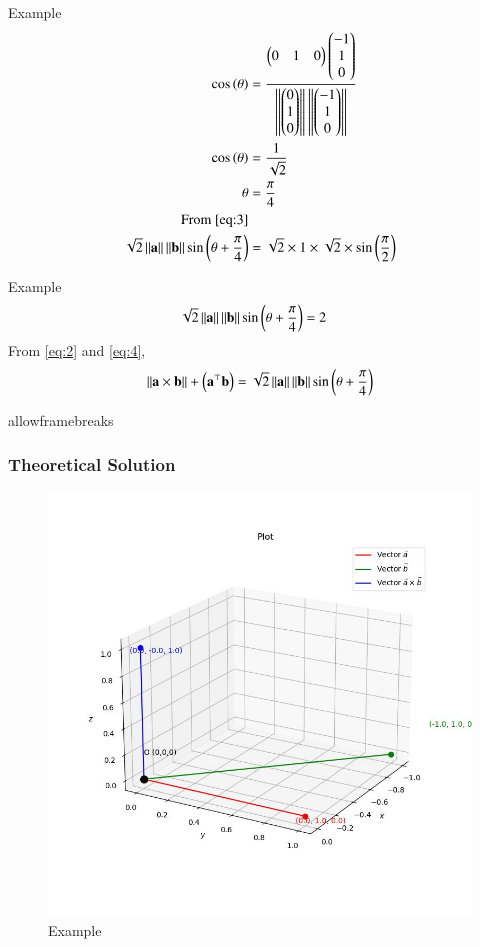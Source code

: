 \documentclass{beamer}
\begin{document}
\begin{frame}{Example}
\begin{align}
    \cos\left(\theta\right) &= \frac{\begin{pmatrix}0 & 1 &  0\end{pmatrix} \begin{pmatrix}-1 \\ 1 \\ 0\end{pmatrix}}{\left\lVert\begin{pmatrix}0 \\ 1 \\  0\end{pmatrix}\right\rVert\left\lVert\begin{pmatrix}-1 \\ 1 \\ 0\end{pmatrix}\right\rVert} \\
    \cos\left(\theta\right) &= \frac{1}{\sqrt{2}} \\
    \theta &= \frac{\pi}{4} \label{eq:3} \\
    \text{From \eqref{eq:3}} \\
    \sqrt{2} \left\lVert\mathbf{a}\right\rVert \left\lVert\mathbf{b}\right\rVert \sin\left(\theta + \frac{\pi}{4}\right) &= \sqrt{2} \times 1 \times \sqrt{2} \times \sin\left(\frac{\pi}{2}\right)
\end{align}
\end{frame}

\begin{frame}{Example}
\begin{align}
    \sqrt{2} \left\lVert\mathbf{a}\right\rVert \left\lVert\mathbf{b}\right\rVert \sin\left(\theta + \frac{\pi}{4}\right) &= 2 \label{eq:4}
\end{align}
From \eqref{eq:2} and \eqref{eq:4},
\begin{align*}
\left\lVert\mathbf{a} \times \mathbf{b}\right\rVert + \left(\mathbf{a}^\top\mathbf{b}\right) = \sqrt{2} \left\lVert\mathbf{a}\right\rVert \left\lVert\mathbf{b}\right\rVert \sin\left(\theta + \frac{\pi}{4}\right)
\end{align*}
\end{frame}

\begin{frame}{allowframebreaks}
\frametitle{Theoretical Solution}
\begin{figure}
    \centering
    \includegraphics[width=0.5\columnwidth]{../figs/plot_c.jpg}
    \caption{Example}
    \label{fig:fig}
\end{figure}
\end{frame}
\end{document}
